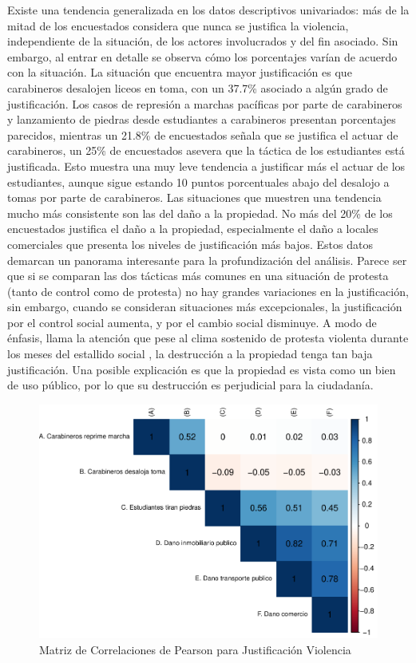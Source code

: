 \documentclass[12pt,twoside]{templates/facsothesis}
\begin{document}
Existe una tendencia generalizada en los datos descriptivos univariados: más de la mitad de los encuestados considera que nunca se justifica la violencia, independiente de la situación, de los actores involucrados y del fin asociado. Sin embargo, al entrar en detalle se observa cómo los porcentajes varían de acuerdo con la situación. La situación que encuentra mayor justificación es que carabineros desalojen liceos en toma, con un 37.7\% asociado a algún grado de justificación. Los casos de represión a marchas pacíficas por parte de carabineros y lanzamiento de piedras desde estudiantes a carabineros presentan porcentajes parecidos, mientras un 21.8\% de encuestados señala que se justifica el actuar de carabineros, un 25\% de encuestados asevera que la táctica de los estudiantes está justificada. Esto muestra una muy leve tendencia a justificar más el actuar de los estudiantes, aunque sigue estando 10 puntos porcentuales abajo del desalojo a tomas por parte de carabineros. Las situaciones que muestren una tendencia mucho más consistente son las del daño a la propiedad. No más del 20\% de los encuestados justifica el daño a la propiedad, especialmente el daño a locales comerciales que presenta los niveles de justificación más bajos. Estos datos demarcan un panorama interesante para la profundización del análisis. Parece ser que si se comparan las dos tácticas más comunes en una situación de protesta (tanto de control como de protesta) no hay grandes variaciones en la justificación, sin embargo, cuando se consideran situaciones más excepcionales, la justificación por el control social aumenta, y por el cambio social disminuye. A modo de énfasis, llama la atención que pese al clima sostenido de protesta violenta durante los meses del estallido social \citep{Joignant2020}, la destrucción a la propiedad tenga tan baja justificación. Una posible explicación es que la propiedad es vista como un bien de uso público, por lo que su destrucción es perjudicial para la ciudadanía.

\begin{figure}[!ht]

{\centering \includegraphics[width=1\linewidth,]{tesis_files/figure-latex/matpearson-1} 

}

\caption{Matriz de Correlaciones de Pearson  para Justificación Violencia}\label{fig:matpearson}
\end{figure}
\end{document}
